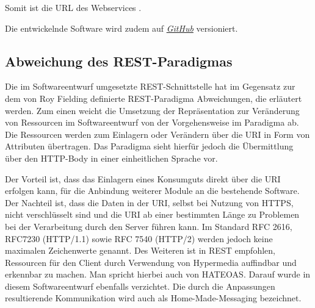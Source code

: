 Somit ist die \ac{URL} des Webservices .

Die entwickelnde Software wird zudem auf \href{https://github.com/lucasmerkel/dhbw-advancedswe-programmentwurf/tree/main/swe_programmentwurf/consumergoods-inventory-planner}{\textit{GitHub}} versioniert.

\subsection*{Abweichung des \ac{REST}-Paradigmas}
Die im Softwareentwurf umgesetzte \ac{REST}-Schnittstelle hat im Gegensatz zur dem von Roy Fielding definierte \ac{REST}-Paradigma Abweichungen, die erläutert werden.
Zum einen weicht die Umsetzung der Repräsentation zur Veränderung von Ressourcen im Softwareentwurf von der Vorgehensweise im Paradigma ab.
Die Ressourcen werden zum Einlagern oder Verändern über die \ac{URI} in Form von Attributen übertragen.
Das Paradigma sieht hierfür jedoch die Übermittlung über den \ac{HTTP}-Body in einer einheitlichen Sprache vor.

Der Vorteil ist, dass das Einlagern eines Konsumguts direkt über die \ac{URI} erfolgen kann, für die Anbindung weiterer Module an die bestehende Software.
Der Nachteil ist, dass die Daten in der \ac{URI}, selbst bei Nutzung von \ac{HTTPS}, nicht verschlüsselt sind und die \ac{URI} ab einer bestimmten Länge zu Problemen bei der Verarbeitung durch den Server führen kann.
Im Standard RFC 2616, RFC7230 (HTTP/1.1) sowie RFC 7540 (HTTP/2) werden jedoch keine maximalen Zeichenwerte genannt.
Des Weiteren ist in \ac{REST} empfohlen, Ressourcen für den Client durch Verwendung von Hypermedia auffindbar und erkennbar zu machen.
Man spricht hierbei auch von \ac{HATEOAS}. Darauf wurde in diesem Softwareentwurf ebenfalls verzichtet.
Die durch die Anpassungen resultierende Kommunikation wird auch als Home-Made-Messaging bezeichnet.
